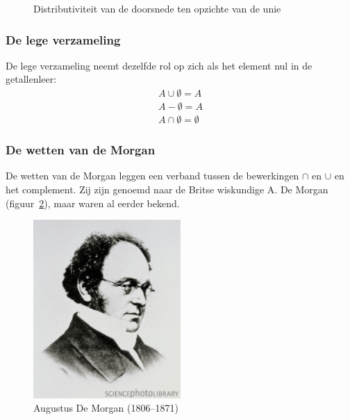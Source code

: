 \begin{figure}
\centering
{}\qquad
{}
\caption{Distributiviteit van de doorsnede ten opzichte van de unie}
\label{fig:distr2}
\end{figure}

\subsubsection{De lege verzameling}
De lege verzameling neemt dezelfde rol op zich als het element nul in de getallenleer:
\begin{equation*}
\begin{split}
A\cup \emptyset=A \\
A-\emptyset=A\\
A\cap\emptyset=\emptyset 
\end{split}
\end{equation*}

\subsubsection{De wetten van de Morgan}
De wetten van de Morgan leggen een verband tussen de 
bewerkingen $\cap$ en $\cup$ en het complement. 
Zij zijn genoemd naar de Britse wiskundige A. De Morgan 
(figuur~\ref{fig:morgan}), maar waren al eerder bekend.
\begin{figure}[htbp]
\centering
\includegraphics[width=0.5\textwidth]{figuren/verzamelingen_relaties/AugustusDeMorgan}
\caption{Augustus De Morgan (1806--1871)}
\label{fig:morgan}
\end{figure}

